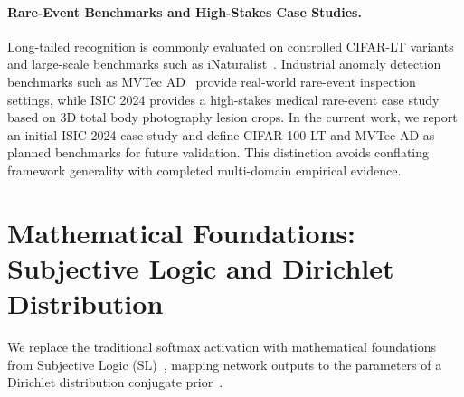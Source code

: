 \documentclass[letterpaper]{article} %
\begin{document}
\paragraph{Rare-Event Benchmarks and High-Stakes Case Studies.} Long-tailed recognition is commonly evaluated on controlled CIFAR-LT variants and large-scale benchmarks such as iNaturalist~\cite{liu2019large}. Industrial anomaly detection benchmarks such as MVTec AD~\cite{bergmann2019mvtec} provide real-world rare-event inspection settings, while ISIC 2024 provides a high-stakes medical rare-event case study based on 3D total body photography lesion crops. In the current work, we report an initial ISIC 2024 case study and define CIFAR-100-LT and MVTec AD as planned benchmarks for future validation. This distinction avoids conflating framework generality with completed multi-domain empirical evidence.

\section{Mathematical Foundations: Subjective Logic and Dirichlet Distribution}\label{sec:math}

We replace the traditional softmax activation with mathematical foundations from Subjective Logic (SL)~\cite{josang2016subjective}, mapping network outputs to the parameters of a Dirichlet distribution conjugate prior~\cite{sensoy2018evidential}.
\end{document}
